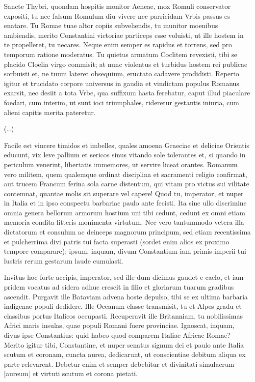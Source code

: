 Sancte Thybri, quondam hospitis monitor Aeneae, mox Romuli conservator expositi, tu nec falsum Romulum diu vivere nec parricidam Vrbis passus es enatare. Tu Romae tuae altor copiis subvehendis, tu munitor moenibus ambiendis, merito Constantini victoriae particeps esse voluisti, ut ille hostem in te propelleret, tu necares. Neque enim semper es rapidus et torrens, sed pro temporum ratione moderatus. Tu quietus armatum Coclitem revexisti, tibi se placido Cloelia virgo commisit; at nunc violentus et turbidus hostem rei publicae sorbuisti et, ne tuum lateret obsequium, eructato cadavere prodidisti. Reperto igitur et trucidato corpore universus in gaudia et vindictam populus Romanus exarsit, nec desiit a tota Vrbe, qua suffixum hasta ferebatur, caput illud piaculare foedari, cum interim, ut sunt ioci triumphales, rideretur gestantis iniuria, cum alieni capitis merita pateretur. 

(\dots)

Facile est vincere timidos et imbelles, quales amoena Graeciae et deliciae Orientis educunt, vix leve pallium et sericos sinus vitando sole tolerantes et, si quando in periculum venerint, libertatis immemores, ut servire liceat orantes. Romanum vero militem, quem qualemque ordinat disciplina et sacramenti religio confirmat, aut trucem Francum ferina sola carne distentum, qui vitam pro victus sui vilitate contemnat, quantae molis sit superare vel capere! Quod tu, imperator, et nuper in Italia et in ipso conspectu barbariae paulo ante fecisti. Ita sine ullo discrimine omnia genera bellorum armorum hostium uni tibi cedunt, cedunt ex omni etiam memoria condita litteris monimenta virtutum. Nec vero tantummodo vetera illa dictatorum et consulum ac deinceps magnorum principum, sed etiam recentissima et pulcherrima divi patris tui facta superasti (sordet enim alios ex proximo tempore comparare); ipsum, inquam, divum Constantium iam primis imperii tui lustris rerum gestarum laude cumulasti.

Invitus hoc forte accipis, imperator, sed ille dum dicimus gaudet e caelo, et iam pridem vocatus ad sidera adhuc crescit in filio et gloriarum tuarum gradibus ascendit. Purgavit ille Bataviam advena hoste depulso, tibi se ex ultima barbaria indigenae populi dedidere. Ille Oceanum classe transmisit, tu et Alpes gradu et classibus portus Italicos occupasti. Recuperavit ille Britanniam, tu nobilissimas Africi maris insulas, quae populi Romani fuere provinciae. Ignoscat, inquam, divus ipse Constantius: quid habeo quod comparem Italiae Africae Romae? Merito igitur tibi, Constantine, et nuper senatus signum dei et paulo ante Italia scutum et coronam, cuncta aurea, dedicarunt, ut conscientiae debitum aliqua ex parte relevarent. Debetur enim et semper debebitur et divinitati simulacrum [aureum] et virtuti scutum et corona pietati.

